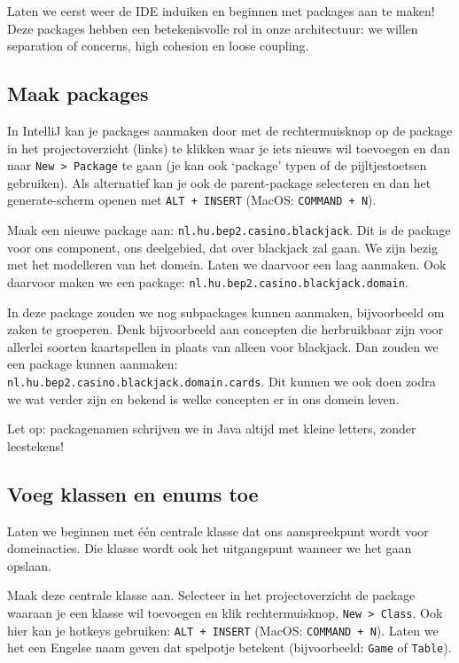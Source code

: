 \documentclass[dutch,a4paper,12pt,doubleside]{book}
\begin{document}
Laten we eerst weer de IDE induiken en beginnen met packages aan te maken!
Deze packages hebben een betekenisvolle rol in onze architectuur: 
we willen separation of concerns, high cohesion en loose coupling.

\subsection{Maak packages}
In IntelliJ kan je packages aanmaken door met de rechtermuisknop op de package
in het projectoverzicht (links) te klikken waar je iets nieuws wil toevoegen
en dan naar \texttt{New > Package} te gaan 
(je kan ook `package' typen of de pijltjestoetsen gebruiken). 
Als alternatief kan je ook de parent-package selecteren en dan 
het generate-scherm openen met \texttt{ALT + INSERT} (MacOS: \texttt{COMMAND + N}). 

Maak een nieuwe package aan: \texttt{nl.hu.bep2.casino.blackjack}.
Dit is de package voor ons component, ons deelgebied, dat over blackjack zal gaan.
We zijn bezig met het modelleren van het domein. Laten we daarvoor een laag aanmaken.
Ook daarvoor maken we een package: \texttt{nl.hu.bep2.casino.blackjack.domain}.

In deze package zouden we nog subpackages kunnen aanmaken, bijvoorbeeld om zaken te groeperen.
Denk bijvoorbeeld aan concepten die herbruikbaar zijn voor allerlei soorten kaartspellen 
in plaats van alleen voor blackjack. Dan zouden we een package kunnen aanmaken: 
\\ \texttt{nl.hu.bep2.casino.blackjack.domain.cards}. Dit kunnen we ook doen zodra we 
wat verder zijn en bekend is welke concepten er in ons domein leven.

Let op: packagenamen schrijven we in Java altijd met kleine letters,
zonder leestekens!

\subsection{Voeg klassen en enums toe}
Laten we beginnen met één centrale klasse dat ons aanspreekpunt wordt
voor domeinacties. Die klasse wordt ook het uitgangspunt wanneer we het gaan opslaan.

Maak deze centrale klasse aan. Selecteer in het projectoverzicht de 
package waaraan je een klasse wil toevoegen en klik rechtermuisknop, \texttt{New > Class}. 
Ook hier kan je hotkeys gebruiken: \texttt{ALT + INSERT} (MacOS: \texttt{COMMAND + N}).
Laten we het een Engelse naam geven dat spelpotje betekent (bijvoorbeeld: \texttt{Game} of \texttt{Table}).
\end{document}
